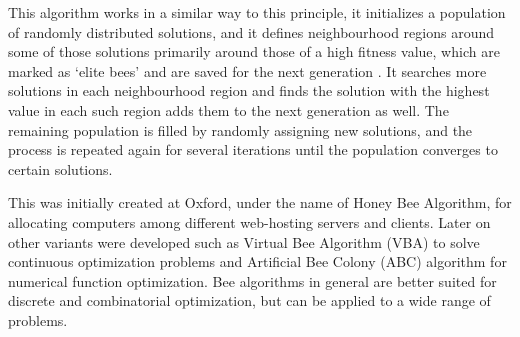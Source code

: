 \documentclass[12pt]{exam}
\begin{document}
\begin{questions}
This algorithm works in a similar way to this principle,  it initializes a population of randomly distributed solutions, and it defines neighbourhood regions around some of those solutions primarily around those of a high fitness value, which are marked as ‘elite bees’ and are saved for the next generation . It searches more solutions in each neighbourhood region and finds the solution with the highest value in each such region adds them to the next generation as well. The remaining population is filled by randomly assigning new solutions, and the process is repeated again for several iterations until the population converges to certain solutions.
	
	This was initially created at Oxford, under the name of Honey Bee Algorithm, for allocating computers among different web-hosting servers and clients. Later on other variants were developed such as Virtual Bee Algorithm (VBA) to solve continuous optimization problems and Artificial Bee Colony (ABC) algorithm for numerical function optimization. Bee algorithms in general are better suited for discrete and combinatorial optimization, but can be applied to a wide range of problems.


\end{questions}



\printbibliography
\end{document}
